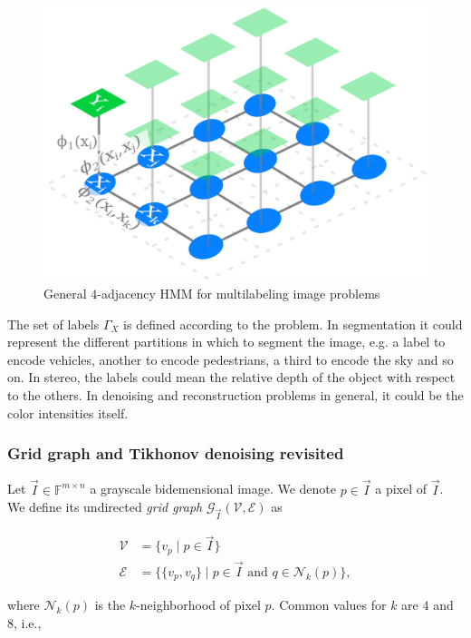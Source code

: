 \begin{figure}
\center
\includegraphics[scale=0.10]{figures/chapter3/hmm-example.png}
\caption{General $4$-adjacency HMM for multilabeling image problems}
\label{ch2:fig:hmm-multilabeling}
\end{figure}



The set of labels $\Gamma_X$ is defined according to the problem. In segmentation it could represent the different partitions in which to segment the image, e.g. a label to encode vehicles, another to encode pedestrians, a third to encode the sky and so on. In stereo, the labels could mean the relative depth of the object with respect to the others. In denoising and reconstruction problems in general, it could be the color intensities itself. 

\subsubsection{Grid graph and Tikhonov denoising revisited}
Let $\vec{I} \in \mathbb{F}^{m \times n}$ a grayscale bidemensional image. We denote $p \in \vec{I}$ a pixel of $\vec{I}$.  We define its undirected \emph{grid graph} $\mathcal{G}_{\vec{I}}(\mathcal{V},\mathcal{E})$ as

\begin{align*}
	\mathcal{V} &= \{ v_p \; | \; p \in \vec{I} \} \\
	\mathcal{E} &= \big\{ \{v_p,v_q\} \; | \; p \in \vec{I} \text{ and } q \in \mathcal{N}_k(p) \big\},
\end{align*}

where $\mathcal{N}_k(p)$ is the $k$-neighborhood of pixel $p$. Common values for $k$ are $4$ and $8$, i.e., 

